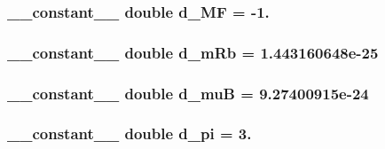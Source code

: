 \hypertarget{set_up_8cu_ad5c6a29d5e5d7f81c07fcdeac2e12ee8}{
\subsubsection[{d\+\_\+\+M\+F}]{\setlength{\rightskip}{0pt plus 5cm}\+\_\+\+\_\+constant\+\_\+\+\_\+ double d\+\_\+\+M\+F = -\/1.}}\label{set_up_8cu_ad5c6a29d5e5d7f81c07fcdeac2e12ee8}
\hypertarget{set_up_8cu_a19b0469e2c969c9dc1f4d2b9d075ef98}{
\subsubsection[{d\+\_\+m\+Rb}]{\setlength{\rightskip}{0pt plus 5cm}\+\_\+\+\_\+constant\+\_\+\+\_\+ double d\+\_\+m\+Rb = 1.\+443160648e-\/25}}\label{set_up_8cu_a19b0469e2c969c9dc1f4d2b9d075ef98}
\hypertarget{set_up_8cu_a93a53c442fbe59aedf7224c0f142979c}{
\subsubsection[{d\+\_\+mu\+B}]{\setlength{\rightskip}{0pt plus 5cm}\+\_\+\+\_\+constant\+\_\+\+\_\+ double d\+\_\+mu\+B = 9.\+27400915e-\/24}}\label{set_up_8cu_a93a53c442fbe59aedf7224c0f142979c}
\hypertarget{set_up_8cu_a246b126f6551267fd21c168b0c1b4fac}{
\subsubsection[{d\+\_\+pi}]{\setlength{\rightskip}{0pt plus 5cm}\+\_\+\+\_\+constant\+\_\+\+\_\+ double d\+\_\+pi = 3.}}\label{set_up_8cu_a246b126f6551267fd21c168b0c1b4fac}
